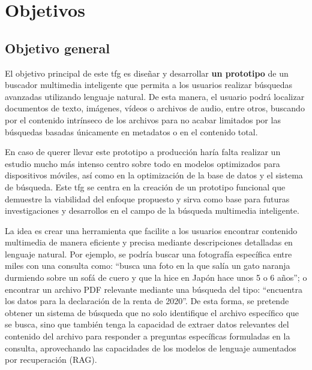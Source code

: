 
\chapter{Objetivos}
\label{objetivos}

\section{Objetivo general}
El objetivo principal de este \gls{tfg} es diseñar y desarrollar \textbf{un prototipo} de un buscador multimedia inteligente que permita a los usuarios realizar búsquedas avanzadas utilizando lenguaje natural. De esta manera, el usuario podrá localizar documentos de texto, imágenes, vídeos o archivos de audio, entre otros, buscando por el contenido intrínseco de los archivos para no acabar limitados por las búsquedas basadas únicamente en metadatos o en el contenido total.

En caso de querer llevar este prototipo a producción haría falta realizar un estudio mucho más intenso centro sobre todo en modelos optimizados para dispositivos móviles, así como en la optimización de la base de datos y el sistema de búsqueda. Este \gls{tfg} se centra en la creación de un prototipo funcional que demuestre la viabilidad del enfoque propuesto y sirva como base para futuras investigaciones y desarrollos en el campo de la búsqueda multimedia inteligente.

La idea es crear una herramienta que facilite a los usuarios encontrar contenido multimedia de manera eficiente y precisa mediante descripciones detalladas en lenguaje natural. Por ejemplo, se podría buscar una fotografía específica entre miles con una consulta como: “busca una foto en la que salía un gato naranja durmiendo sobre un sofá de cuero y que la hice en Japón hace unos 5 o 6 años”; o encontrar un archivo PDF relevante mediante una búsqueda del tipo: “encuentra los datos para la declaración de la renta de 2020”.
De esta forma, se pretende obtener un sistema de búsqueda que no solo identifique el archivo específico que se busca, sino que también tenga la capacidad de extraer datos relevantes del contenido del archivo para responder a preguntas específicas formuladas en la consulta, aprovechando las capacidades de los modelos de lenguaje aumentados por recuperación (RAG).

